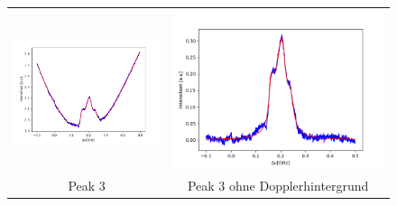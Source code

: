 \documentclass[a4paper,parskip]{scrartcl}
\begin{document}
\begin{figure}[p]
\begin{tabular}{cc}
    \includegraphics[scale = 0.45]{./saturation/peak3/fit.png}  &  \includegraphics[scale = 0.45]{./saturation/peak3/gaussCorrected.png}  \\
    {\footnotesize Peak 3} & {\footnotesize Peak 3 ohne Dopplerhintergrund}  \\

\end{tabular}
\end{figure}
\end{document}
